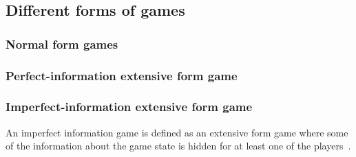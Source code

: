 \subsection{Different forms of games}

\subsubsection{Normal form games}

\subsubsection{Perfect-information extensive form game}

\subsubsection{Imperfect-information extensive form game}
\label{sec:game_imperfect_information}
An imperfect information game is defined as an extensive form game where some
of the information about the game state is hidden for at least one of the
players~\cite{Berwanger2008}.
